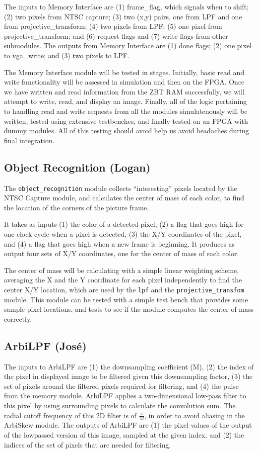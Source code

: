 \documentclass[10pt]{article}
\begin{document}
The inputs to Memory Interface are (1) frame\_flag, which signals when to shift; (2) two pixels from NTSC capture; (3) two (x,y) pairs, one from LPF and one from projective\_transform; (4) two pixels from LPF; (5) one pixel from projective\_transform; and (6) request flags and (7) write flags from other submodules. The outputs from Memory Interface are (1) done flags; (2) one pixel to vga\_write; and (3) two pixels to LPF.

The Memory Interface module will be tested in stages. Initially, basic read and write functionality will be assessed in simulation and then on the FPGA. Once we have written and read information from the ZBT RAM successfully, we will attempt to write, read, and display an image. Finally, all of the logic pertaining to handling read and write requests from all the modules simulatenously will be written, tested using extensive testbenches, and finally tested on an FPGA with dummy modules. All of this testing should avoid help us avoid headaches during final integration.

\subsection{Object Recognition (Logan)}
The {\tt object\_recognition} module collects ``interesting'' pixels located by the NTSC Capture module, and calculates the center of mass of each color, to find the location of the corners of the picture frame.

It takes as inputs (1) the color of a detected pixel, (2) a flag that goes high for one clock cycle when a pixel is detected, (3) the X/Y coordinates of the pixel, and (4) a flag that goes high when a new frame is beginning. It produces as output four sets of X/Y coordinates, one for the center of mass of each color.

The center of mass will be calculating with a simple linear weighting scheme, averaging the X and the Y coordinate for each pixel independently to find the center X/Y location, which are used by the {\tt lpf} and the {\tt projective\_transfom} module. This module can be tested with a simple test bench that provides some sample pixel locations, and tests to see if the module computes the center of mass correctly.

\subsection{ArbiLPF (Jos\'{e})}
The inputs to ArbiLPF are (1) the downsampling coefficient (M), (2) the index of the pixel in displayed image to be filtered given this downsampling factor, (3) the set of pixels around the filtered pixels required for filtering, and (4) the pulse from the memory module. ArbiLPF applies a two-dimensional low-pass filter to this pixel by using surrounding pixels to calculate the convolution sum. The radial cutoff frequency of this 2D filter is of \( \frac{\pi}{M} \), in order to avoid aliasing in the ArbiSkew module. The outputs of ArbiLPF are (1) the pixel values of the output of the lowpassed version of this image, sampled at the given index, and (2) the indices of the set of pixels that are needed for filtering.
\end{document}
